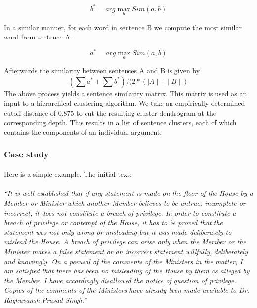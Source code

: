 \[ b^* = arg \max_b Sim(a,b) \]

In a similar manner, for each word in sentence B we compute the most similar word from sentence A.

\[ a^* = arg \max_a Sim(a,b) \]

Afterwards the similarity between sentences A and B is given by
\[ ( \sum{a^*} + \sum{b^*}) / (2 * (\mid A\mid + \mid B \mid ) \]
The above process yields a sentence similarity matrix. This matrix is used as an input to a hierarchical clustering algorithm. We take an empirically determined cutoff distance of 0.875 to cut the resulting cluster dendrogram at the corresponding depth. This results in a list of sentence clusters, each of which contains the components of an individual argument.
\subsubsection*{Case study}
\paragraph*{}Here is a simple example. The initial text:
\paragraph*{}\emph{``It is well established that if any statement is made on the floor of the House by a Member or Minister which another Member believes to be untrue, incomplete or incorrect, it does not constitute a breach of privilege.  In order to constitute a breach of privilege or contempt of the House, it has to be proved that the statement was not only wrong or misleading but it was made deliberately to mislead the House.  A breach of privilege can arise only when the Member or the Minister makes a false statement or an incorrect statement willfully, deliberately and knowingly. On a perusal of the comments of the Ministers in the matter, I am satisfied that there has been no misleading of the House by them as alleged by the Member. I have accordingly disallowed the notice of question of privilege.  Copies of the comments of the Ministers have already been made available to Dr. Raghuvansh Prasad Singh.''}
